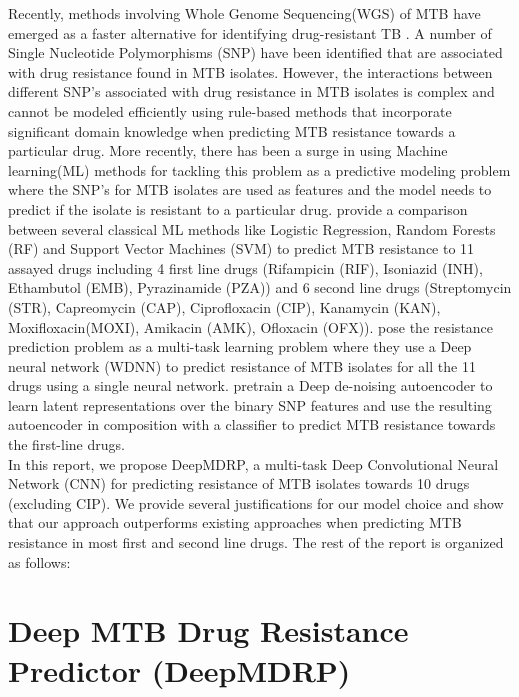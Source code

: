 \documentclass{article}
\begin{document}
\setlength{\parindent}{2ex}
Recently, methods involving Whole Genome Sequencing(WGS) of MTB have emerged as a faster alternative for
identifying drug-resistant TB \cite{article}. A number of Single Nucleotide Polymorphisms (SNP) have been identified that are associated
with drug resistance found in MTB isolates. However, the interactions between different SNP's associated 
with drug resistance in MTB isolates is complex and cannot be modeled efficiently using rule-based
methods that incorporate significant domain knowledge when predicting MTB resistance towards a particular drug.
More recently, there has been a surge in using Machine learning(ML) methods for tackling this problem as a predictive
modeling problem where the SNP's for MTB isolates are used as features and the model needs to predict if the
isolate is resistant to a particular drug. \cite{10.1093/bioinformatics/btx801} provide a comparison between several classical ML methods like
Logistic Regression, Random Forests (RF) and Support Vector Machines (SVM) to predict MTB resistance to 11 assayed drugs
including 4 first line drugs (Rifampicin (RIF), Isoniazid (INH), Ethambutol (EMB), Pyrazinamide (PZA)) and
6 second line drugs (Streptomycin (STR), Capreomycin (CAP), Ciprofloxacin (CIP), Kanamycin (KAN), Moxifloxacin(MOXI),
Amikacin (AMK), Ofloxacin (OFX)). \cite{CHEN2019356} pose the resistance prediction problem as a multi-task learning problem where
they use a Deep neural network (WDNN) to predict resistance of MTB isolates for all the 11 drugs using a single
neural network. \cite{10.1093/bioinformatics/btz067} pretrain a Deep de-noising autoencoder to learn latent representations over the binary SNP features
and use the resulting autoencoder in composition with a classifier to predict MTB resistance towards the first-line drugs.\\

In this report, we propose DeepMDRP, a multi-task Deep Convolutional Neural Network (CNN) for predicting resistance of MTB isolates
towards 10 drugs (excluding CIP). We provide several justifications for our model choice and show that our
approach outperforms existing approaches when predicting MTB resistance in most first and second line drugs. The rest of
the report is organized as follows:

\section{Deep MTB Drug Resistance Predictor (DeepMDRP)}
\label{headings}
\end{document}
